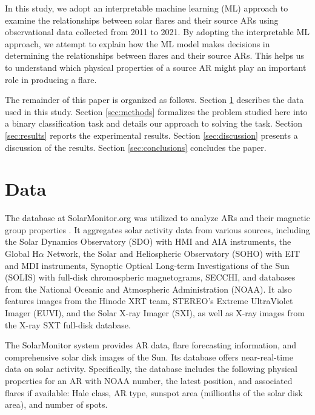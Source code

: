 \documentclass[draft]{agujournal2019}
\begin{document}
In this study, we adopt an
interpretable machine learning
(ML) approach to examine the relationships between solar flares
and their source ARs using observational data collected from
2011 to 2021. By adopting the interpretable ML approach, we attempt to explain how the ML model makes decisions in determining the relationships
between flares and their source ARs.
This helps us to understand which physical properties of a source AR might play an important role in producing a flare.

The remainder of this paper is organized as follows.
Section \ref{sec:data} describes the data used in this study.
Section \ref{sec:methods} formalizes the problem studied here into a binary classification task and details our approach 
to solving the task. Section \ref{sec:results} reports the experimental results. Section \ref{sec:discussion} presents a discussion of the results. Section \ref{sec:conclusions} concludes the paper.

\section{Data}
\label{sec:data} 

The database at SolarMonitor.org was utilized to analyze
ARs and their magnetic group properties \citep{2002SoPh..209..171G}. 
It aggregates solar activity data from various sources, including the Solar Dynamics Observatory (SDO) with HMI and AIA instruments, the Global H$\alpha$ Network, 
the Solar and Heliospheric Observatory
(SOHO) with EIT and MDI instruments, 
Synoptic Optical Long-term Investigations of the Sun (SOLIS)
with full-disk chromospheric magnetograms, 
SECCHI, and databases from the National Oceanic and Atmospheric Administration (NOAA). 
It also features images from the Hinode XRT team, 
STEREO's Extreme UltraViolet Imager (EUVI),
and the Solar X-ray Imager (SXI),
as well as X-ray images from the X-ray SXT full-disk database. 

The SolarMonitor system provides AR data, 
flare forecasting information, 
and comprehensive solar disk images of the Sun. 
Its database offers near-real-time data on solar activity.
Specifically, the database includes the following physical properties
for an AR with NOAA number, the latest position, and
associated flares if available:
Hale class, AR type, sunspot area (millionths of the solar disk area), and number of spots.
\end{document}
